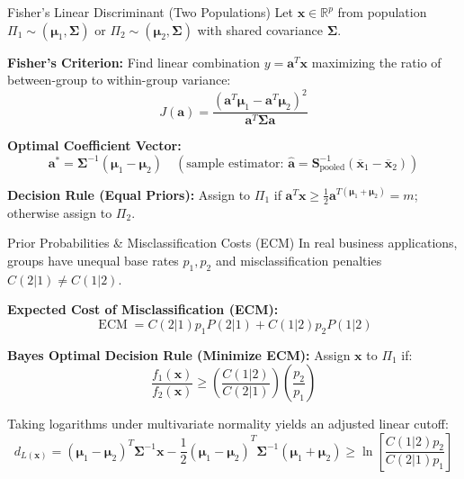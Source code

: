 \documentclass[aspectratio=169,ignorenonframetext]{beamer}
\begin{document}
\begin{frame}{Fisher's Linear Discriminant (Two Populations)}
Let \(\mathbf{x} \in \mathbb{R}^{p}\) from population
\(\Pi_{1} \sim \left( \mathbf{\mu}_{1},\mathbf{\Sigma} \right)\) or
\(\Pi_{2} \sim \left( \mathbf{\mu}_{2},\mathbf{\Sigma} \right)\) with
shared covariance \(\mathbf{\Sigma}\).

\textbf{Fisher's Criterion:} Find linear combination
\(y = \mathbf{a}^{T}\mathbf{x}\) maximizing the ratio of between-group
to within-group variance:
\[J\left( \mathbf{a} \right) = \frac{\left( \mathbf{a}^{T}\mathbf{\mu}_{1} - \mathbf{a}^{T}\mathbf{\mu}_{2} \right)^{2}}{\mathbf{a}^{T}\mathbf{\Sigma}\mathbf{a}}\]

\textbf{Optimal Coefficient Vector:}
\[\mathbf{a}^{\ast} = \mathbf{\Sigma}^{- 1}\left( \mathbf{\mu}_{1} - \mathbf{\mu}_{2} \right)\quad\left( \text{sample estimator:  }\hat{\mathbf{a}} = \mathbf{S}_{\text{pooled}}^{- 1}\left( {\overline{\mathbf{x}}}_{1} - {\overline{\mathbf{x}}}_{2} \right) \right)\]

\textbf{Decision Rule (Equal Priors):} Assign to \(\Pi_{1}\) if
\(\mathbf{a}^{T}\mathbf{x} \geq \frac{1}{2}\mathbf{a}^{T\left( \mathbf{\mu}_{1} + \mathbf{\mu}_{2} \right)} = m\);
otherwise assign to \(\Pi_{2}\).
\end{frame}

\begin{frame}{Prior Probabilities \& Misclassification Costs (ECM)}
In real business applications, groups have unequal base rates
\(p_{1},p_{2}\) and misclassification penalties
\(C\left( 2|1 \right) \neq C\left( 1|2 \right)\).

\textbf{Expected Cost of Misclassification (ECM):}
\[\operatorname{ECM} = C\left( 2|1 \right)p_{1}P\left( 2|1 \right) + C\left( 1|2 \right)p_{2}P\left( 1|2 \right)\]

\textbf{Bayes Optimal Decision Rule (Minimize ECM):} Assign
\(\mathbf{x}\) to \(\Pi_{1}\) if:
\[\frac{f_{1}\left( \mathbf{x} \right)}{f_{2}\left( \mathbf{x} \right)} \geq \left( \frac{C\left( 1|2 \right)}{C\left( 2|1 \right)} \right)\left( \frac{p_{2}}{p_{1}} \right)\]

Taking logarithms under multivariate normality yields an adjusted linear
cutoff:
\[d_{L\left( \mathbf{x} \right)} = \left( \mathbf{\mu}_{1} - \mathbf{\mu}_{2} \right)^{T}\mathbf{\Sigma}^{- 1}\mathbf{x} - {\frac{1}{2}(\mathbf{\mu}_{1} - \mathbf{\mu}_{2})}^{T}\mathbf{\Sigma}^{- 1}\left( \mathbf{\mu}_{1} + \mathbf{\mu}_{2} \right) \geq \ln\left\lbrack \frac{C\left( 1|2 \right)p_{2}}{C\left( 2|1 \right)p_{1}} \right\rbrack\]
\end{frame}
\end{document}
